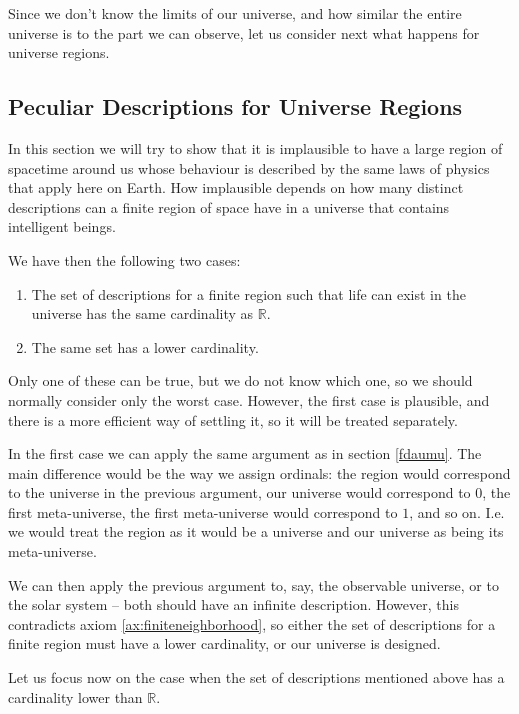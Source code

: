 \documentclass[a4paper
,draft
]{article}
\def\reale{\mathbb{R}}
\begin{document}
Since we don't know the limits of our universe, and how similar
the entire universe is to the part we can observe, let us consider next
what happens for universe regions.

\subsection{Peculiar Descriptions for Universe Regions}
\label{sec:peculiarregions}

In this section we will try to show that it is implausible to have a large
region of spacetime around us whose behaviour is described by the same laws
of physics that apply here on Earth.
How implausible depends on how many
distinct descriptions can a finite region of space have in a universe
that contains intelligent beings.

We have then the following two cases:
\begin{enumerate}
  \item The set of descriptions for a finite region such that life
      can exist in the universe has the same cardinality as $\reale$.
  \item The same set has a lower cardinality.
\end{enumerate}
Only one of these can be true, but we do not know which one, so we should
normally consider only the worst case. However, the first case is plausible,
and there is a more efficient way of settling it, so it will be treated
separately.

In the first case we can apply the same argument
as in section \ref{fdaumu}. The main difference would be the way we assign
ordinals: the region would correspond to the universe in the previous argument,
our universe would correspond to $0$, the first meta-universe,
the first meta-universe would correspond
to $1$, and so on. I.e. we would treat the region as it would be a universe
and our universe as being its meta-universe.

We can then apply the previous argument to, say, the observable universe, or
to the solar system -- both should have an infinite description.
However, this contradicts axiom \ref{ax:finiteneighborhood}, so either the
set of descriptions for a finite region must have a lower cardinality, or our
universe is designed.

Let us focus now on the case when the set of descriptions mentioned above
has a cardinality lower than $\reale$.
\end{document}
